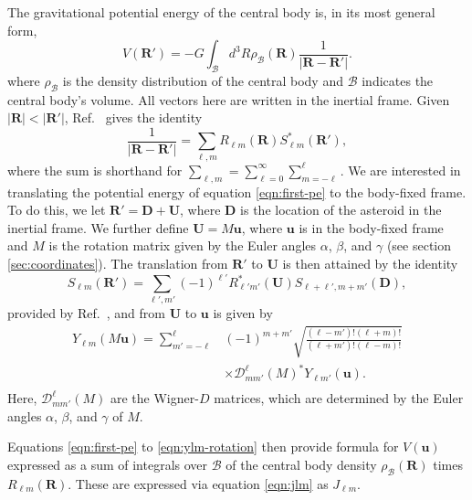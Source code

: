 The gravitational potential energy of the central body is, in its most general form,
\begin{equation}
V(\bm R') = -G\int_\mathcal{B} d^3 R \rho_\mathcal{B}(\bm R) \frac{1}{|\bm{R}-\bm{R'}|}.
\label{eqn:first-pe}
\end{equation}
where $\rho_\mathcal{B}$ is the density distribution of the central body and $\mathcal{B}$ indicates the central body's volume. All vectors here are written in the inertial frame. Given $|\bm{R}| < |\bm{R'}|$, Ref.~\cite{Gelderen1998TheSO} gives the identity
\begin{equation}
  \frac{1}{|\bm R - \bm R'|} = \sum_{\ell, m} R_{\ell m}(\bm R) S_{\ell m}^*(\bm R'),
  \label{eqn:ylm-expansion}
\end{equation}
where the sum is shorthand for $\sum_{\ell, m} = \sum_{\ell = 0}^\infty \sum_{m=-\ell}^\ell$.
We are interested in translating the potential energy of equation \ref{eqn:first-pe} to the body-fixed frame. To do this, we let $\bm{R'} = \bm D + \bm U$, where $\bm D$ is the location of the asteroid in the inertial frame. We further define $\bm U = M\bm u$, where $\bm u$ is in the body-fixed frame and $M$ is the rotation matrix given by the Euler angles $\alpha$, $\beta$, and $\gamma$ (see section \ref{sec:coordinates}). The translation from $\bm {R'}$ to $\bm U$ is then attained by the identity 
\begin{equation}
  S_{\ell m}(\bm R') = \sum_{\ell', m'} (-1)^{\ell'}R^*_{\ell' m'}(\bm U)S_{\ell+\ell', m + m'} (\bm D),
  \label{eqn:ylm-translation}
\end{equation}  
provided by Ref.~\cite{Gelderen1998TheSO}, and from $\bm U$ to $\bm u$ is given by
\begin{equation}
  \begin{split}
    Y_{\ell m}(M\bm u) = \sum_{m'=-\ell}^\ell & (-1)^{m+m'}\sqrt{\frac{(\ell-m')!(\ell+m)!}{(\ell+m')!(\ell-m)!}} \\
    & \times \mathcal{D}^\ell_{mm'}(M)^* Y_{\ell m'}(\bm u).\\
  \end{split}
  \label{eqn:ylm-rotation}
\end{equation}
Here, $\mathcal{D}^\ell_{mm'}(M)$ are the Wigner-$D$ matrices, which are determined by the Euler angles $\alpha$, $\beta$, and $\gamma$ of $M$.

Equations \ref{eqn:first-pe} to \ref{eqn:ylm-rotation} then provide formula for $V(\bm u)$ expressed as a sum of integrals over $\mathcal{B}$ of the central body density $\rho_\mathcal{B}(\bm R)$ times $R_{\ell m}(\bm R)$. These are expressed via equation \ref{eqn:jlm} as $J_{\ell m}$.

